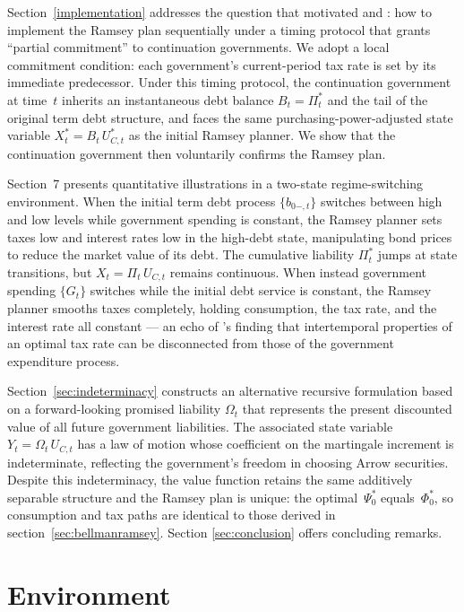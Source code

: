 \documentclass[12pt]{article}
\begin{document}
Section~\ref{implementation} addresses  the  question that motivated \cite{LucasStokey1983} and \cite*{debortoli2021optimal}: how
to implement the Ramsey plan sequentially under a timing protocol that grants ``partial commitment'' to continuation governments. We adopt  a  local commitment condition:  each government's current-period tax rate is set by its immediate predecessor. Under this timing protocol, the continuation government at time~$t$  inherits an instantaneous debt balance $B_t = \Pi_t^\ast$ and the tail of the original term debt structure, and faces the   same  purchasing-power-adjusted state variable $X_t^\ast = B_t\, U_{C,t}^\ast$ as the initial Ramsey planner. We show that the continuation government then voluntarily confirms  the Ramsey plan.

Section~7 presents quantitative illustrations in a two-state regime-switching environment. When the initial term debt process $\{b_{0-,t}\}$ switches between  high and low levels while government spending is  constant, the Ramsey planner sets taxes low and interest rates low in the high-debt state, manipulating bond prices  to reduce the market value of its debt. The cumulative liability $\Pi_t^\ast$ jumps at state transitions, but $X_t = \Pi_t\, U_{C,t}$ remains continuous.  When instead  government spending $\{G_t\}$  switches while the  initial  debt service is constant, the Ramsey planner smooths  taxes  completely, holding consumption, the tax rate, and the interest rate all  constant --- an echo of \citet{barro1979determination}'s finding that intertemporal properties of an optimal tax rate can be disconnected from those of the government expenditure process.  

Section~\ref{sec:indeterminacy} constructs an alternative recursive formulation based on a  forward-looking   promised liability  $\Omega_t$ that represents   the present discounted value  of all future government liabilities. The associated state variable $Y_t = \Omega_t\, U_{C,t}$ has a law of motion whose coefficient on the  martingale increment is indeterminate, reflecting the government's freedom in choosing Arrow securities. Despite this indeterminacy, the value function retains the  same additively separable structure and the Ramsey plan is  unique: the optimal~$\Psi_0^\ast$ equals~$\Phi_0^\ast$, so consumption and tax  paths are identical to those derived in section~\ref{sec:bellmanramsey}.
Section \ref{sec:conclusion} offers concluding remarks.

\section{Environment \label{sec:environ}}
\end{document}
